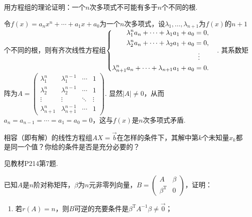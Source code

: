\begin{exercise}
    \begin{exgroup}
        \item 用方程组的理论证明：一个$n$次多项式不可能有多于$n$个不同的根.
        \begin{answer}
            令$f(x)=a_nx^n+\cdots+a_1x+a_0$为一个$n$次多项式，设$\lambda_1,\ldots,\lambda_{n+1}$为$f(x)$的$n+1$个不同的根，则有齐次线性方程组$\begin{cases} \begin{aligned}
                \lambda_1^n a_n+\cdots+\lambda_1a_1+a_0         & =0,               \\
                \lambda_2^n a_n+\cdots+\lambda_2a_1+a_0         & =0,               \\
                                                                & \vdotswithin{ = } \\
                \lambda_{n+1}^n a_n+\cdots+\lambda_{n+1}a_1+a_0 & =0.
            \end{aligned} \end{cases}$. 其系数矩阵为$A=\begin{pmatrix}
            \lambda_1^n     & \lambda_1^{n-1}     & \cdots & 1      \\
            \lambda_2^n     & \lambda_2^{n-1}     & \cdots & 1      \\
            \vdots          & \vdots              & \ddots & \vdots \\
            \lambda_{n+1}^n & \lambda_{n+1}^{n-1} & \cdots & 1
        \end{pmatrix}$. 显然$|A|\neq 0$，从而$a_n=a_{n-1}=\cdots=a_1=a_0=0$，这与$f(x)$是$n$次多项式矛盾.
        \end{answer}

        \item 相容（即有解）的线性方程组$AX=\vec{b}$在怎样的条件下，其解中第$k$个未知量$x_k$都是同一个值？你给的条件是否是充分必要的？
        \begin{answer}
            见教材P214第7题.
        \end{answer}

        \item 已知$A$是$n$阶对称矩阵，$\beta$为$n$元非零列向量，$B=\begin{pmatrix}
                A & \beta \\ \beta^\mathrm{T} & 0
            \end{pmatrix}$，证明：
        \begin{enumerate}
            \item 若$r(A)=n$，则$B$可逆的充要条件是$\beta^\mathrm{T}A^{-1}\beta \neq \vec{0}$；


\end{enumerate}
\end{exgroup}
\end{exercise}
